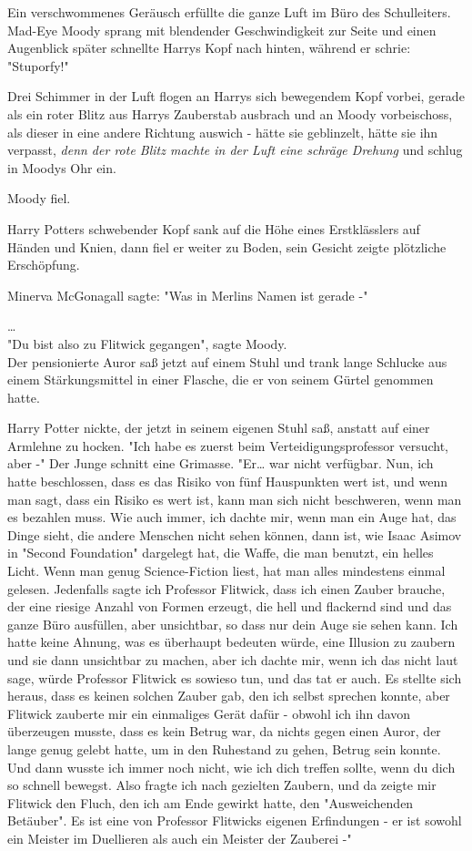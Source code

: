 {Ein verschwommenes Geräusch erfüllte die ganze Luft im Büro des Schulleiters. Mad-Eye Moody sprang mit blendender Geschwindigkeit zur Seite und einen Augenblick später schnellte Harrys Kopf nach hinten, während er schrie: "Stuporfy!"

Drei Schimmer in der Luft flogen an Harrys sich bewegendem Kopf vorbei, gerade als ein roter Blitz aus Harrys Zauberstab ausbrach und an Moody vorbeischoss, als dieser in eine andere Richtung auswich - hätte sie geblinzelt, hätte sie ihn verpasst, \emph{denn der rote Blitz machte in der Luft eine schräge Drehung} und schlug in Moodys Ohr ein.

Moody fiel.

Harry Potters schwebender Kopf sank auf die Höhe eines Erstklässlers auf Händen und Knien, dann fiel er weiter zu Boden, sein Gesicht zeigte plötzliche Erschöpfung.

Minerva McGonagall sagte: "Was in Merlins Namen ist gerade -"

…\\ "Du bist also zu Flitwick gegangen", sagte Moody.\\ Der pensionierte Auror saß jetzt auf einem Stuhl und trank lange Schlucke aus einem Stärkungsmittel in einer Flasche, die er von seinem Gürtel genommen hatte.

Harry Potter nickte, der jetzt in seinem eigenen Stuhl saß, anstatt auf einer Armlehne zu hocken. "Ich habe es zuerst beim Verteidigungsprofessor versucht, aber -" Der Junge schnitt eine Grimasse. "Er… war nicht verfügbar. Nun, ich hatte beschlossen, dass es das Risiko von fünf Hauspunkten wert ist, und wenn man sagt, dass ein Risiko es wert ist, kann man sich nicht beschweren, wenn man es bezahlen muss. Wie auch immer, ich dachte mir, wenn man ein Auge hat, das Dinge sieht, die andere Menschen nicht sehen können, dann ist, wie Isaac Asimov in "Second Foundation" dargelegt hat, die Waffe, die man benutzt, ein helles Licht. Wenn man genug Science-Fiction liest, hat man alles mindestens einmal gelesen. Jedenfalls sagte ich Professor Flitwick, dass ich einen Zauber brauche, der eine riesige Anzahl von Formen erzeugt, die hell und flackernd sind und das ganze Büro ausfüllen, aber unsichtbar, so dass nur dein Auge sie sehen kann. Ich hatte keine Ahnung, was es überhaupt bedeuten würde, eine Illusion zu zaubern und sie dann unsichtbar zu machen, aber ich dachte mir, wenn ich das nicht laut sage, würde Professor Flitwick es sowieso tun, und das tat er auch. Es stellte sich heraus, dass es keinen solchen Zauber gab, den ich selbst sprechen konnte, aber Flitwick zauberte mir ein einmaliges Gerät dafür - obwohl ich ihn davon überzeugen musste, dass es kein Betrug war, da nichts gegen einen Auror, der lange genug gelebt hatte, um in den Ruhestand zu gehen, Betrug sein konnte. Und dann wusste ich immer noch nicht, wie ich dich treffen sollte, wenn du dich so schnell bewegst. Also fragte ich nach gezielten Zaubern, und da zeigte mir Flitwick den Fluch, den ich am Ende gewirkt hatte, den "Ausweichenden Betäuber". Es ist eine von Professor Flitwicks eigenen Erfindungen - er ist sowohl ein Meister im Duellieren als auch ein Meister der Zauberei -"

}

